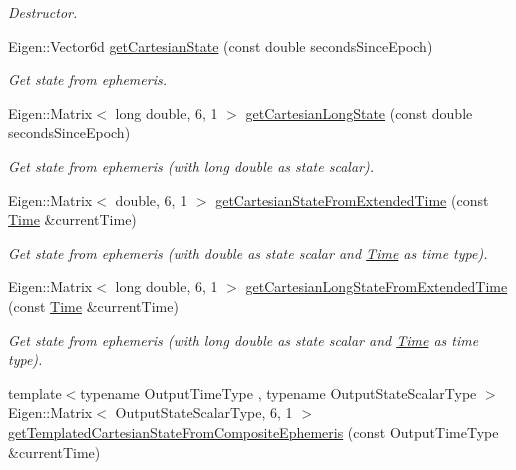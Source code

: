\begin{DoxyCompactItemize}
\begin{DoxyCompactList}\small\item\em Destructor. \end{DoxyCompactList}\item 
Eigen\+::\+Vector6d \hyperlink{classtudat_1_1ephemerides_1_1CompositeEphemeris_adaf00c6374bab84ecfa0a9f7e92d5f36}{get\+Cartesian\+State} (const double seconds\+Since\+Epoch)
\begin{DoxyCompactList}\small\item\em Get state from ephemeris. \end{DoxyCompactList}\item 
Eigen\+::\+Matrix$<$ long double, 6, 1 $>$ \hyperlink{classtudat_1_1ephemerides_1_1CompositeEphemeris_a42bbb7b71d00f1a9ae2dc70aa1e63b94}{get\+Cartesian\+Long\+State} (const double seconds\+Since\+Epoch)
\begin{DoxyCompactList}\small\item\em Get state from ephemeris (with long double as state scalar). \end{DoxyCompactList}\item 
Eigen\+::\+Matrix$<$ double, 6, 1 $>$ \hyperlink{classtudat_1_1ephemerides_1_1CompositeEphemeris_a91b0a66e98778b9ff6f3f70aae93fe88}{get\+Cartesian\+State\+From\+Extended\+Time} (const \hyperlink{classtudat_1_1Time}{Time} \&current\+Time)
\begin{DoxyCompactList}\small\item\em Get state from ephemeris (with double as state scalar and \hyperlink{classtudat_1_1Time}{Time} as time type). \end{DoxyCompactList}\item 
Eigen\+::\+Matrix$<$ long double, 6, 1 $>$ \hyperlink{classtudat_1_1ephemerides_1_1CompositeEphemeris_ac539a6b811fbbe82ff38461fb21f8e66}{get\+Cartesian\+Long\+State\+From\+Extended\+Time} (const \hyperlink{classtudat_1_1Time}{Time} \&current\+Time)
\begin{DoxyCompactList}\small\item\em Get state from ephemeris (with long double as state scalar and \hyperlink{classtudat_1_1Time}{Time} as time type). \end{DoxyCompactList}\item 
{\footnotesize template$<$typename Output\+Time\+Type , typename Output\+State\+Scalar\+Type $>$ }\\Eigen\+::\+Matrix$<$ Output\+State\+Scalar\+Type, 6, 1 $>$ \hyperlink{classtudat_1_1ephemerides_1_1CompositeEphemeris_aa87a7cbda8ca887a6f795f14a4601a36}{get\+Templated\+Cartesian\+State\+From\+Composite\+Ephemeris} (const Output\+Time\+Type \&current\+Time)

\end{DoxyCompactItemize}
